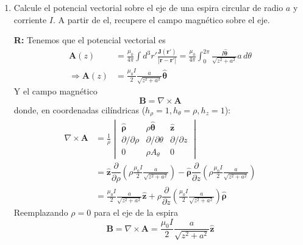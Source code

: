 \documentclass[]{article}
\numberwithin{equation}{section}
\newcommand{\0}{\textcolor{gray}{0}}
\newcommand{\ro}{\nabla\times}
\newcommand{\rv}{\mathbf{r}}
\newcommand{\xv}{\mathbf{x}}
\newcommand{\yv}{\mathbf{y}}
\newcommand{\zv}{\mathbf{z}}
\newcommand{\xhat}{\hat{\xv}}
\newcommand{\yhat}{\hat{\yv}}
\newcommand{\zhat}{\hat{\zv}}
\newcommand{\that}{\hat{\mathbf{\theta}}}
\newcommand{\rhhat}{\hat{\mathbf{\rho}}}
\newcommand{\uo}{\mu_{0}}
\newcommand{\rdif}{\rv - \rv'}
\newcommand{\pd}[2]{\dfrac{\partial #1}{\partial #2}}
\newcommand{\n}[1]{\mathbf{#1}}
\begin{document}
\begin{enumerate}
	\textbf{R:} La ley de Biot-Savart:
	\begin{equation*}
		\n{B}(\rv) = \frac{\uo I}{4 \pi} \oint_{C} d\n{l}' \times \frac{\rdif}{|\rdif|^3}
	\end{equation*}
	Poniendo el origen en el punto del segmento que conecta perpendicularmente con el punto de observación, tenemos que \(\rv = s \yhat, \rv' = x\xhat, ,d\n{l}' = \xhat\,dx\), y los límites de integración definidos por \(\alpha_1\) y \(\alpha_2\): \([-s\tan\alpha_{1}, s\tan\alpha_{2}]\):
	\begin{align*}
		\n{B}(\rv) &= \frac{\uo I}{4 \pi} \int_{-s\tan\alpha_{1}}^{s\tan\alpha_{2}} dx \xhat \times \frac{(s \yhat - x\xhat)}{(s^2 + x^2)^{3/2}}\\
		&= \frac{\uo I}{4 \pi} \int_{-s\tan\alpha_{1}}^{s\tan\alpha_{2}} \zhat\, dx \frac{s}{(s^2 + x^2)^{3/2}}\\
		&= \frac{\uo I}{4 \pi} \left[\frac{\tan (\alpha_1)}{s\sec(\alpha_1)}+\frac{\tan (\alpha_2)}{s \sec(\alpha_2)}\right]\\
		&= \frac{\uo I}{4 \pi} \frac{1}{s}\left[\sin (\alpha_1) + \sin (\alpha_2)\right]
	\end{align*}
	
	\item Calcule el potencial vectorial sobre el eje de una espira circular de radio \(a\) y corriente \(I\). A partir de el, recupere el campo magnético sobre el eje.
	
	\textbf{R:} Tenemos que el potencial vectorial es
	\begin{align*}
		\n{A}(z) &= \frac{\uo}{4 \pi} \int d^3 r' \frac{\n{J}(\rv')}{|\rv - \rv'|} = \frac{\uo}{4 \pi} \int_{0}^{2\pi} \frac{I \that}{\sqrt{z^2 + a^2}} a \, d\theta\\
		\Rightarrow \n{A}(z) &= \frac{\uo I}{2} \frac{a}{\sqrt{z^2 + a^2}} \that
	\end{align*}
	Y el campo magnético
	\begin{equation*}
		\n{B} = \ro\n{A}
	\end{equation*}
	donde, en coordenadas cilíndricas (\(h_\rho = 1, h_\theta = \rho, h_z = 1\)):
	\begin{align*}
		\ro\n{A} &= \frac{1}{\rho}\begin{vmatrix}
		\rhhat & \rho\that & \zhat\\
		\partial/\partial \rho & \partial/\partial \theta & \partial/\partial z\\
		0 & \rho A_\theta & 0
		\end{vmatrix}\\
		&= \zhat\pd{}{\rho}\left(\rho \frac{\uo I}{2} \frac{a}{\sqrt{z^2 + a^2}}\right) - \rhhat\pd{}{z}\left(\rho \frac{\uo I}{2} \frac{a}{\sqrt{z^2 + a^2}}\right) \\
		&= \frac{\uo I}{2} \frac{a}{\sqrt{z^2 + a^2}} \zhat + \rho\pd{}{z}\left(\frac{\uo I}{2} \frac{a}{\sqrt{z^2 + a^2}}\right)\rhhat
	\end{align*}
	Reemplazando \(\rho = 0\) para el eje de la espira
	\begin{equation*}
		\n{B} = \ro\n{A} = \frac{\uo I}{2} \frac{a}{\sqrt{z^2 + a^2}} \zhat 
	\end{equation*}
	

\end{enumerate}
\end{document}
